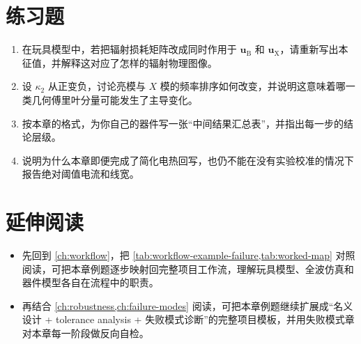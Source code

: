 \section*{练习题}
\begin{enumerate}
  \item \basicq 在玩具模型中，若把辐射损耗矩阵改成同时作用于 $\bm{u}_{\mathrm{B}}$ 和 $\bm{u}_{\mathrm{X}}$，请重新写出本征值，并解释这对应了怎样的辐射物理图像。

  \item \basicq 设 $\kappa_2$ 从正变负，讨论亮模与 $X$ 模的频率排序如何改变，并说明这意味着哪一类几何傅里叶分量可能发生了主导变化。

  \item \midq 按本章的格式，为你自己的器件写一张“中间结果汇总表”，并指出每一步的结论层级。

  \item \hardq 说明为什么本章即便完成了简化电热回写，也仍不能在没有实验校准的情况下报告绝对阈值电流和线宽。
\end{enumerate}

\section*{延伸阅读}
\begin{itemize}
  \item 先回到 \cref{ch:workflow}，把 \cref{tab:workflow-example-failure,tab:worked-map} 对照阅读，可把本章例题逐步映射回完整项目工作流，理解玩具模型、全波仿真和器件模型各自在流程中的职责。

  \item 再结合 \cref{ch:robustness,ch:failure-modes} 阅读，可把本章例题继续扩展成“名义设计 + tolerance analysis + 失败模式诊断”的完整项目模板，并用失败模式章对本章每一阶段做反向自检。
\end{itemize}
